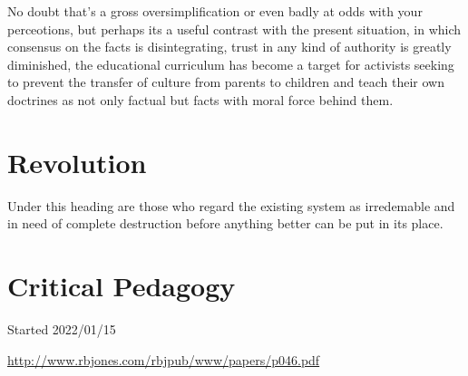 \documentclass[10pt,titlepage]{article}
\begin{document}
No doubt that's a gross oversimplification or even badly at odds with your perceotions, but perhaps its a useful contrast with the present situation, in which consensus on the facts is disintegrating, trust in any kind of authority is greatly diminished, the educational curriculum has become a target for activists seeking to prevent the transfer of culture from parents to children and teach their own doctrines as not only factual but facts with moral force behind them.

\section{Revolution}

Under this heading are those who regard the existing system as irredemable and in need of complete destruction before anything better can be put in its place.

\cite{pluckrose-cynical,lindsay-racemarx,friere-poled,gottesman-criturn}

\appendix

\section{Critical Pedagogy}


\cite{friere-poled,gottesman-criturn}


{}





\tiny{
Started 2022/01/15


\href{http://www.rbjones.com/rbjpub/www/papers/p046.pdf}{http://www.rbjones.com/rbjpub/www/papers/p046.pdf}

}%
\end{document}
